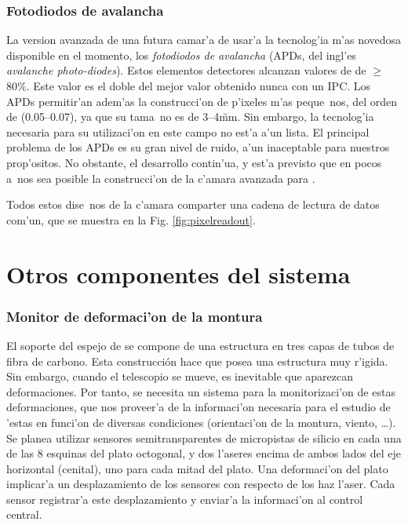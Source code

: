 \subsubsection{Fotodiodos de avalancha}
%
La version avanzada de una futura camar'a de \MAGIC usar'a la
tecnolog'ia m'as novedosa disponible en el momento, los
\emph{fotodiodos de avalancha} (APDs, del ingl'es \emph{avalanche
  photo-diodes}). Estos elementos detectores alcanzan valores de \QE
de $\geq$80\%. Este valor es el doble del mejor valor obtenido nunca
con un IPC. Los APDs permitir'an adem'as la construcci'on de p'ixeles
m'as peque~nos, del orden de (0.05\deg--0.07\deg), ya que su tama~no
es de 3--4\u{mm}. Sin embargo, la tecnolog'ia necesaria para su
utilizaci'on en este campo no est'a a'un lista. El principal problema
de los APDs es su gran nivel de ruido, a'un inaceptable para nuestros
prop'ositos.  No obstante, el desarrollo contin'ua, y est'a previsto
que en pocos a~nos sea posible la construcci'on de la c'amara avanzada
para \MAGIC.

\bigskip

Todos estos dise~nos de la c'amara comparter una cadena de lectura de
datos com'un, que se muestra en la Fig. \ref{fig:pixelreadout}.


\section{Otros componentes del sistema}
\label{sec:othercomp}

\subsubsection{Monitor de deformaci'on de la montura}
%
El soporte del espejo de \MAGIC se compone de una estructura en tres
capas de tubos de fibra de carbono. Esta construcci{\'o}n hace que \MAGIC
posea una estructura muy r'igida. Sin embargo, cuando el telescopio se
mueve, es inevitable que aparezcan deformaciones. Por tanto, se
necesita un sistema para la monitorizaci'on de estas deformaciones,
que nos proveer'a de la informaci'on necesaria para el estudio de
'estas en funci'on de diversas condiciones (orientaci'on de la
montura, viento, \ldots). Se planea \cite{MAGIC:DR} utilizar sensores
semitransparentes de micropistas de silicio en cada una de las 8
esquinas del plato octogonal, y dos l'aseres encima de ambos lados del
eje horizontal (cenital), uno para cada mitad del plato. Una
deformaci'on del plato implicar'a un desplazamiento de los sensores
con respecto de los haz l'aser. Cada sensor registrar'a este
desplazamiento y enviar'a la informaci'on al control central.

